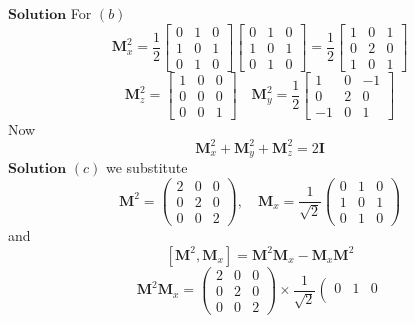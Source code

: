\documentclass{article}
\begin{document}
\begin{flushleft}
$\boxed{\textbf{Solution}}$  For $(b)$
$$\mathbf{M}_{x}^{2}=\frac{1}{2}\left[\begin{array}{ccc}{0} & {1} & {0} \\ {1} & {0} & {1} \\ {0} & {1} & {0}\end{array}\right]\left[\begin{array}{ccc}{0} & {1} & {0} \\ {1} & {0} & {1} \\ {0} & {1} & {0}\end{array}\right]=\frac{1}{2}\left[\begin{array}{ccc}{1} & {0} & {1} \\ {0} & {2} & {0} \\ {1} & {0} & {1}\end{array}\right]$$
$$\mathbf{M}_z^2 = \left[\begin{array}{ccc}{1} & {0} & {0} \\ {0} & {0} & {0} \\ {0} & {0} & {1}\end{array}\right] \quad \mathbf{M}_y^2 = \dfrac{1}{2}\left[\begin{array}{ccc}{1} & {0} & {-1} \\ {0} & {2} & {0} \\ {-1} & {0} & {1}\end{array}\right]$$
Now
$$\mathbf{M}_x^2 + \mathbf{M}_y^2 + \mathbf{M}_z^2 = 2\mathbf{I}$$
$\boxed{\textbf{Solution}}$  $(c)$ we substitute
$$
\mathbf{M}^{2}=\left(\begin{array}{lll}
2 & 0 & 0 \\
0 & 2 & 0 \\
0 & 0 & 2
\end{array}\right), \quad \mathbf{M}_{x}=\frac{1}{\sqrt{2}}\left(\begin{array}{lll}
0 & 1 & 0 \\
1 & 0 & 1 \\
0 & 1 & 0
\end{array}\right)
$$
and
$$
\left[\mathbf{M}^{2}, \mathbf{M}_{x}\right]=\mathbf{M}^{2} \mathbf{M}_{x}-\mathbf{M}_{x} \mathbf{M}^{2}
$$
$$
\mathbf{M}^{2} \mathbf{M}_{x}=\left(\begin{array}{lll}
2 & 0 & 0 \\
0 & 2 & 0 \\
0 & 0 & 2
\end{array}\right) \times \frac{1}{\sqrt{2}}\left(\begin{array}{lll}
0 & 1 & 0 \\

\end{array}$$
\end{flushleft}
\end{document}
